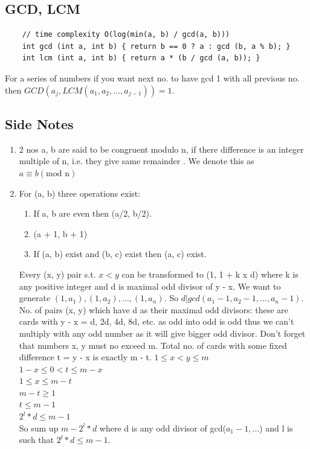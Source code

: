\documentclass[8pt, a4paper, oneside, twocolumn]{extarticle}
\begin{document}
\subsection{GCD, LCM}
\begin{verbatim}
    // time complexity O(log(min(a, b) / gcd(a, b)))
    int gcd (int a, int b) { return b == 0 ? a : gcd (b, a % b); }
    int lcm (int a, int b) { return a * (b / gcd (a, b)); }
\end{verbatim}
For a series of numbers if you want next no. to have gcd 1 with all previous no. then $GCD(a_j, LCM(a_1, a_2, \dots, a_{j - 1})) = 1$.
\subsection{Side Notes}
\begin{enumerate}
    \item 2 nos a, b are said to be congruent modulo n, if there difference is an integer multiple of n, i.e. they give same remainder . We denote this as $a \equiv b (\text{mod n})$
    \item For (a, b) three operations exist:
    \begin{enumerate}
        \item If a, b are even then (a/2, b/2).
        \item (a + 1, b + 1)
        \item If (a, b) exist and (b, c) exist then (a, c) exist.
    \end{enumerate}
    Every (x, y) pair s.t. $x < y$ can be transformed to (1, 1 + k x d) where k is any positive integer and d is maximal odd divisor of y - x. We want to generate $(1, a_1), (1, a_2), \dots, (1, a_n)$. So $d | gcd(a_1 - 1, a_2 - 1, \dots, a_n - 1)$. No. of pairs (x, y) which have d as their maximal odd divisors: these are cards with y - x = d, 2d, 4d, 8d, etc. as odd into odd is odd thus we can't multiply with any odd number as it will give bigger odd divisor. Don't forget that numbers x, y must no exceed m. Total no. of cards with some fixed difference t = y - x is exactly m - t. $1 \leq x < y \leq m$\\
    $1 - x \leq 0 < t \leq m - x$\\
    $1 \leq x \leq m - t$\\
    $m - t \geq 1$\\
    $t \leq m - 1$
    \\$2^l * d \leq m - 1$\\
    So sum up $m - 2^l * d$ where d is any odd divisor of gcd($a_1 - 1, \dots$) and l is such that $2^l * d \leq m - 1$.

\end{enumerate}
\end{document}
